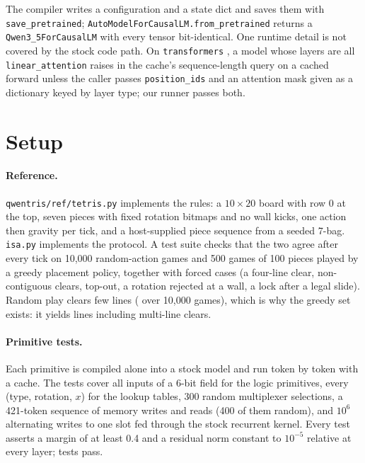 \documentclass[11pt]{article}
\begin{document}
The compiler writes a configuration and a state dict and saves them with \texttt{save\_pretrained}; \texttt{AutoModelForCausalLM.from\_pretrained} returns a \texttt{Qwen3\_5ForCausalLM} with every tensor bit-identical. One runtime detail is not covered by the stock code path. On \texttt{transformers} \nTfVersion{}, a model whose layers are all \texttt{linear\_attention} raises in the cache's sequence-length query on a cached forward unless the caller passes \texttt{position\_ids} and an attention mask given as a dictionary keyed by layer type; our runner passes both.

\section{Setup}
\label{sec:setup}

\paragraph{Reference.} \texttt{qwentris/ref/tetris.py} implements the rules: a $10 \times 20$ board with row 0 at the top, seven pieces with fixed rotation bitmaps and no wall kicks, one action then gravity per tick, and a host-supplied piece sequence from a seeded 7-bag. \texttt{isa.py} implements the protocol. A test suite checks that the two agree after every tick on 10{,}000 random-action games and 500 games of 100 pieces played by a greedy placement policy, together with forced cases (a four-line clear, non-contiguous clears, top-out, a rotation rejected at a wall, a lock after a legal slide). Random play clears few lines (\nPtwoRandLines{} over 10{,}000 games), which is why the greedy set exists: it yields \nPtwoGreedyLines{} lines including \nPzeroGreedyMulti{} multi-line clears.

\paragraph{Primitive tests.} Each primitive is compiled alone into a stock model and run token by token with a cache. The tests cover all inputs of a 6-bit field for the logic primitives, every (type, rotation, $x$) for the lookup tables, 300 random multiplexer selections, a 421-token sequence of memory writes and reads (400 of them random), and $10^6$ alternating writes to one slot fed through the stock recurrent kernel. Every test asserts a margin of at least 0.4 and a residual norm constant to $10^{-5}$ relative at every layer; \nPoneTests{} tests pass.
\end{document}
